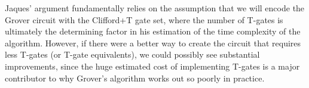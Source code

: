 
Jaques' argument fundamentally relies on the assumption that we will encode the Grover circuit with the Clifford+T gate set, where the number of T-gates is ultimately the determining factor in his estimation of the time complexity of the algorithm. However, if there were a better way to create the circuit that requires less T-gates (or T-gate equivalents), we could possibly see substantial improvements, since the huge estimated cost of implementing T-gates is a major contributor to why Grover's algorithm works out so poorly in practice.